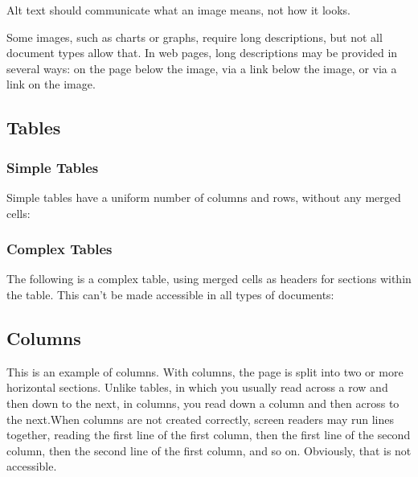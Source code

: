\documentclass{article}
\begin{document}
Alt text should communicate what an image means, not how it looks.

Some images, such as charts or graphs, require long descriptions, but not all document types allow that. In web pages, long descriptions may be provided in several ways: on the page below the image, via a link below the image, or via a link on the image.

\subsection{Tables}
\subsubsection{Simple Tables}
Simple tables have a uniform number of columns and rows, without any merged cells:

\subsubsection{Complex Tables}
The following is a complex table, using merged cells as headers for sections within the table. This can't be made accessible in all types of documents:

\subsection{Columns}
This is an example of columns. With columns, the page is split into two or more horizontal sections. Unlike tables, in which you usually read across a row and then down to the next, in columns, you read down a column and then across to the next.When columns are not created correctly, screen readers may run lines together, reading the first line of the first column, then the first line of the second column, then the second line of the first column, and so on. Obviously, that is not accessible.
\end{document}
